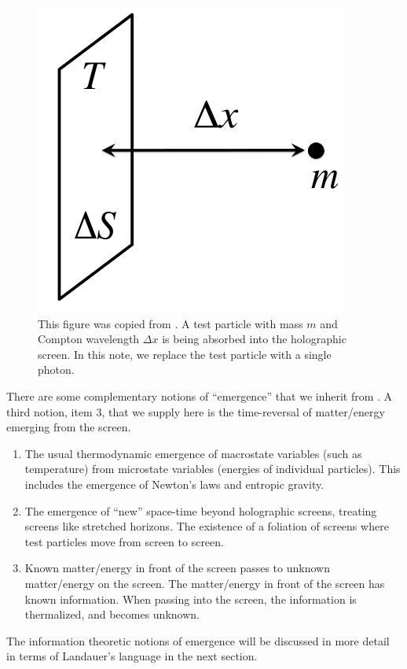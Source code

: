 \documentclass[12pt,a4paper]{article}
\begin{document}
\begin{figure}[h]
\centering
\includegraphics[scale=1.2]{screen.png}
\caption{This figure was copied from \cite{entropic}.  A test particle with mass $m$ and Compton wavelength $\Delta x$ is being absorbed into the holographic screen.  In this note, we replace the test particle with a single photon.}
\label{fig:x cubed graph}
\end{figure}
There are some complementary notions of ``emergence'' that we inherit from \cite{entropic}.  A third notion, item 3, that we supply here is the time-reversal of matter/energy emerging from the screen.
\begin{enumerate}
  \item The usual thermodynamic emergence of macrostate variables (such as temperature) from microstate variables (energies of individual particles).  This includes the emergence of Newton's laws and entropic gravity.
  \item The emergence of ``new'' space-time beyond holographic screens, treating screens like stretched horizons.  The existence of a foliation of screens where test particles move from screen to screen.
  \item Known matter/energy in front of the screen passes to unknown matter/energy on the screen. The matter/energy in front of the screen has known information.  When passing into the screen, the information is thermalized, and becomes unknown.
\end{enumerate}
The information theoretic notions of emergence will be discussed in more detail in terms of Landauer's language in the next section.
\end{document}
